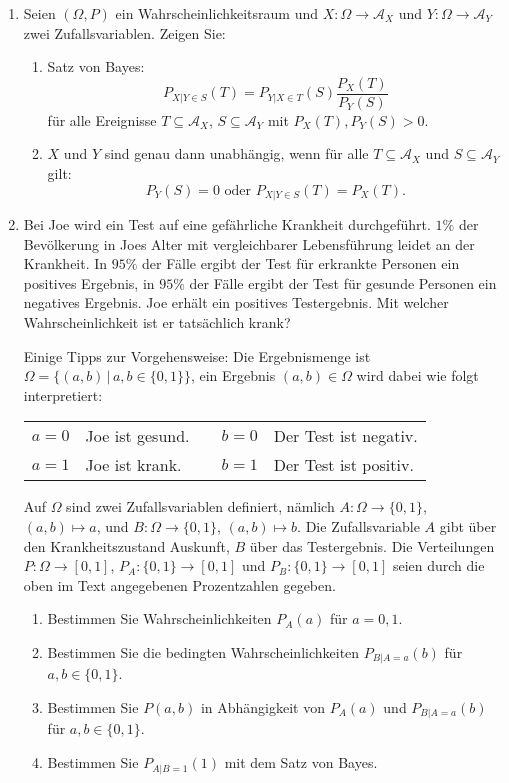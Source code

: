 \documentclass[german]{mhexsheet}
\begin{document}
\begin{exercise}[title = Satz von Bayes]
\begin{enumerate}
 \item Seien $(\Omega, P)$ ein Wahrscheinlichkeitsraum und $X\colon \Omega \rightarrow \mathcal A_X$ und $Y\colon \Omega \rightarrow \mathcal A_Y$ zwei Zufallsvariablen. Zeigen Sie:
 \begin{enumerate}
  \item Satz von Bayes:
  \[P_{X|Y \in S}(T) = P_{Y|X \in T}(S) \frac{P_X(T)}{P_Y(S)}\]
  für alle Ereignisse $T \subseteq \mathcal A_X$, $S \subseteq \mathcal A_Y$ mit $P_X(T), P_Y(S) > 0$. 
  \item $X$ und $Y$ sind genau dann unabhängig, wenn für alle $T \subseteq \mathcal A_X$ und $S \subseteq \mathcal A_Y$ gilt:
  \[P_Y(S) = 0 \text{ oder } P_{X|Y \in S}(T) = P_X(T).\]
 \end{enumerate}
\item Bei Joe wird ein Test auf eine gefährliche Krankheit durchgeführt. $1\%$ der Bevölkerung in Joes Alter mit vergleichbarer Lebensführung leidet an der Krankheit. In $95\%$ der Fälle ergibt der Test für erkrankte Personen ein positives Ergebnis, in $95\%$ der Fälle ergibt der Test für gesunde Personen ein negatives Ergebnis. Joe erhält ein positives Testergebnis. Mit welcher Wahrscheinlichkeit ist er tatsächlich krank? 

Einige Tipps zur Vorgehensweise: Die Ergebnismenge ist $\Omega = \{(a, b)\,|\,a, b \in \{0, 1\}\}$, ein Ergebnis $(a,b) \in \Omega$ wird dabei wie folgt interpretiert:
\begin{center}
\begin{tabular}{lllll}
 $a = 0$ & Joe ist gesund. & \quad &$b = 0$ & Der Test ist negativ. \\
 $a = 1$ & Joe ist krank. & \quad &$b = 1$ & Der Test ist positiv.  
\end{tabular}
\end{center}
Auf $\Omega$ sind zwei Zufallsvariablen definiert, nämlich $A\colon \Omega \rightarrow \{0, 1\}$, $(a, b) \mapsto a$, und $B\colon \Omega \rightarrow \{0, 1\}$, $(a, b) \mapsto b$. Die Zufallsvariable $A$ gibt über den Krankheitszustand Auskunft, $B$ über das Testergebnis. Die Verteilungen $P: \Omega \rightarrow [0, 1]$, $P_A: \{0, 1\} \rightarrow [0, 1]$ und $P_B: \{0, 1\} \rightarrow [0, 1]$ seien durch die oben im Text angegebenen Prozentzahlen gegeben.

\begin{enumerate}
\item Bestimmen Sie Wahrscheinlichkeiten $P_A(a)$ für $a =0, 1$. 
\item Bestimmen Sie die bedingten Wahrscheinlichkeiten $P_{B|A =a}(b)$ für $a, b \in \{0, 1\}$.
\item Bestimmen Sie $P(a, b)$ in Abhängigkeit von $P_A(a)$ und $P_{B|A = a}(b)$ für $a, b \in \{0, 1\}$.
\item Bestimmen Sie $P_{A| B = 1}(1)$ mit dem Satz von Bayes.
\end{enumerate}
 \end{enumerate}
\end{exercise}
\end{document}
